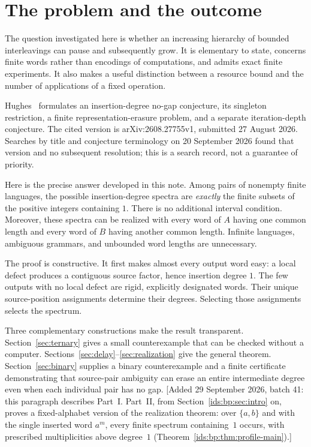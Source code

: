\documentclass[11pt,letterpaper]{article}
\theoremstyle{definition}\newtheorem{definition}[theorem]{Definition}
\theoremstyle{remark}\newtheorem{remark}[theorem]{Remark}
\theoremstyle{definition}\newtheorem{question}[theorem]{Question}
\begin{document}
\newpage
\tableofcontents
\newpage

\section{The problem and the outcome}

The question investigated here is whether an increasing hierarchy of bounded interleavings can pause and subsequently grow. It is elementary to state, concerns finite words rather than encodings of computations, and admits exact finite experiments. It also makes a useful distinction between a resource bound and the number of applications of a fixed operation.

Hughes~\cite[Sections 10--11]{Hughes2026} formulates an insertion-degree no-gap conjecture, its singleton restriction, a finite representation-erasure problem, and a separate iteration-depth conjecture. The cited version is arXiv:2608.27755v1, submitted 27 August 2026. Searches by title and conjecture terminology on 20 September 2026 found that version and no subsequent resolution; this is a search record, not a guarantee of priority.

Here is the precise answer developed in this note. Among pairs of nonempty finite languages, the possible insertion-degree spectra are \emph{exactly} the finite subsets of the positive integers containing $1$. There is no additional interval condition. Moreover, these spectra can be realized with every word of $A$ having one common length and every word of $B$ having another common length. Infinite languages, ambiguous grammars, and unbounded word lengths are unnecessary.

The proof is constructive. It first makes almost every output word easy: a local defect produces a contiguous source factor, hence insertion degree $1$. The few outputs with no local defect are rigid, explicitly designated words. Their unique source-position assignments determine their degrees. Selecting those assignments selects the spectrum.

Three complementary constructions make the result transparent. Section~\ref{sec:ternary} gives a small counterexample that can be checked without a computer. Sections~\ref{sec:delay}--\ref{sec:realization} give the general theorem. Section~\ref{sec:binary} supplies a binary counterexample and a finite certificate demonstrating that source-pair ambiguity can erase an entire intermediate degree even when each individual pair has no gap.
[Added 29 September 2026, batch 41: this paragraph describes Part~I. Part~II, from Section~\ref{ids:bp:sec:intro} on, proves a fixed-alphabet version of the realization theorem: over $\{a,b\}$ and with the single inserted word $a^m$, every finite spectrum containing~$1$ occurs, with prescribed multiplicities above degree~$1$ (Theorem~\ref{ids:bp:thm:profile-main}).]
\end{document}
